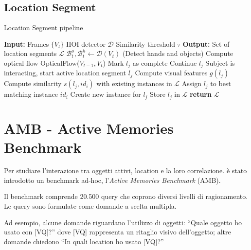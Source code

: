 \subsection{Location Segment}
\begin{algorithm}[H]
\caption{Location Segment pipeline}
\begin{algorithmic}[1]
\State \textbf{Input:}
\State \quad Frames $\{V_t\}$
\State \quad HOI detector $\mathcal{D}$
\State \quad Similarity threshold $\tau$
\State \textbf{Output:}
\State \quad Set of location segments $\mathcal{L}$
\State \quad $\mathcal{B}_t^o, \mathcal{B}_t^h \gets \mathcal{D}(V_t)$ (Detect hands and objects)
\State \quad Compute optical flow OpticalFlow($V_{t-1}, V_t$)
\State \quad \quad Mark $l_j$ as complete
\Else
\State \quad \quad Continue $l_j$
\EndIf
\Else
{}
\State \quad \quad Subject is interacting, start active location segment $l_j$
\EndIf
\EndIf
\EndFor
{}
\State \quad Compute visual features $g(l_j)$
\State \quad Compute similarity $s(l_j, id_i)$ with existing instances in $\mathcal{L}$
\State \quad \quad Assign $l_j$ to best matching instance $id_i$
\Else
\State \quad \quad Create new instance for $l_j$
\EndIf
\State \quad Store $l_j$ in $\mathcal{L}$
\EndFor
\State \textbf{return} $\mathcal{L}$
\end{algorithmic}
\end{algorithm}


\section{AMB - Active Memories Benchmark}
Per studiare l'interazione tra oggetti attivi, location e la loro correlazione. è stato introdotto un benchmark ad-hoc, l'\emph{Active Memories Benchmark} (AMB).

Il benchmark comprende 20.500 query che coprono diversi livelli di ragionamento. Le query sono formulate come domande a scelta multipla.

Ad esempio, alcune domande riguardano l'utilizzo di oggetti: ``Quale oggetto ho usato con [VQ]?'' dove [VQ] rappresenta un ritaglio visivo dell'oggetto; altre domande chiedono ``In quali location ho usato [VQ]?''

